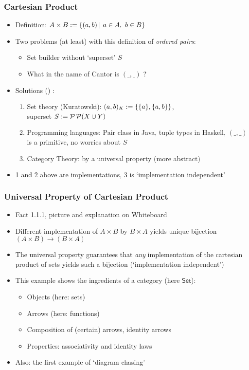 \documentclass[handout]{beamer}
\newcommand{\Set}{\mathsf{Set}}
\begin{document}
\frame
  {   
    \frametitle{Cartesian Product}\label{Ch1:CartesianProduct}

 \begin{itemize}[<+->]
\item Definition: $A\times B := \{(a,b) \mid a\in A,~b\in B\}$
\item Two problems (at least) with this definition of \emph{ordered pairs}:
   \begin{itemize}[<+->]
\item Set builder without `superset' $S$
\item What in the name of Cantor is $(\_,\_)$ ?
   \end{itemize}
\item Solutions  () :
 \begin{enumerate}[<+->]
\item Set theory (Kuratowski): $(a,b)_K := \{\{a\},\{a,b\}\}$, \\
           superset $S:= \operatorname{\mathcal{P}}\operatorname{\mathcal{P}}(X\cup Y)$
\item Programming languages: Pair class in Java, tuple types in Haskell,
$(\_,\_)$ is a primitive, no worries about $S$
\item Category Theory: by a universal property (more abstract)
 \end{enumerate}
\item 1 and 2 above are implementations, 3 is `implementation independent'
 \end{itemize}

 }


\frame
  {   
    \frametitle{Universal Property of Cartesian Product}\label{Ch1:CartesianProductUP}

 \begin{itemize}[<+->]
\item Fact 1.1.1, picture and explanation on Whiteboard
\item Different implementation of $A\times B$ by $B\times A$ yields unique bijection
$(A\times B) \to (B\times A)$
\item The universal property guarantees that \emph{any} implementation
of the cartesian product of sets yields such a bijection (`implementation independent')
\item This example shows the ingredients of a category (here $\Set$):
   \begin{itemize}[<+->]
\item Objects (here: sets)
\item Arrows (here: functions)
\item Composition of (certain) arrows, identity arrows
\item Properties: associativity and identity laws
   \end{itemize}
\item Also: the first example of `diagram chasing'
 \end{itemize}

 }
\end{document}
